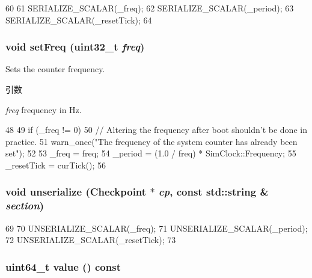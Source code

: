 \begin{DoxyCode}
60 {
61     SERIALIZE_SCALAR(_freq);
62     SERIALIZE_SCALAR(_period);
63     SERIALIZE_SCALAR(_resetTick);
64 }
\end{DoxyCode}
\hypertarget{classGenericTimer_1_1SystemCounter_a3b94395b3dcff3869dd1f0a376d7eb65}{
\subsubsection[{setFreq}]{\setlength{\rightskip}{0pt plus 5cm}void setFreq ({\bf uint32\_\-t} {\em freq})}}
\label{classGenericTimer_1_1SystemCounter_a3b94395b3dcff3869dd1f0a376d7eb65}
Sets the counter frequency. 
\begin{DoxyParams}{引数}
\item[{\em freq}]frequency in Hz. \end{DoxyParams}



\begin{DoxyCode}
48 {
49     if (_freq != 0) {
50         // Altering the frequency after boot shouldn't be done in practice.
51         warn_once("The frequency of the system counter has already been set");
52     }
53     _freq = freq;
54     _period = (1.0 / freq) * SimClock::Frequency;
55     _resetTick = curTick();
56 }
\end{DoxyCode}
\hypertarget{classGenericTimer_1_1SystemCounter_af22e5d6d660b97db37003ac61ac4ee49}{
\subsubsection[{unserialize}]{\setlength{\rightskip}{0pt plus 5cm}void unserialize ({\bf Checkpoint} $\ast$ {\em cp}, \/  const std::string \& {\em section})}}
\label{classGenericTimer_1_1SystemCounter_af22e5d6d660b97db37003ac61ac4ee49}



\begin{DoxyCode}
69 {
70     UNSERIALIZE_SCALAR(_freq);
71     UNSERIALIZE_SCALAR(_period);
72     UNSERIALIZE_SCALAR(_resetTick);
73 }
\end{DoxyCode}
\hypertarget{classGenericTimer_1_1SystemCounter_a22d235cc68f1573b7db58a6f13756797}{
\subsubsection[{value}]{\setlength{\rightskip}{0pt plus 5cm}uint64\_\-t value () const}}
\label{classGenericTimer_1_1SystemCounter_a22d235cc68f1573b7db58a6f13756797}


